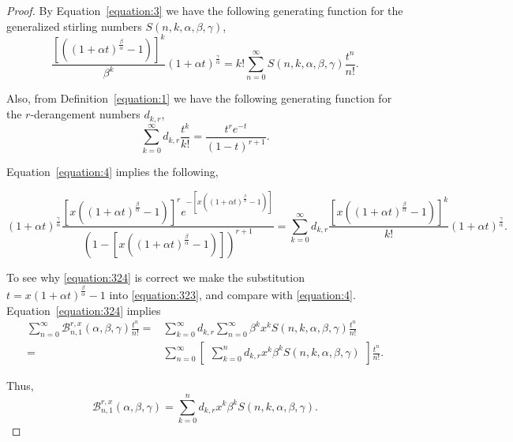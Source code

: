 \documentclass[12pt]{amsart}
\newtheorem{proof 1}{proof 1}
\begin{document}
\begin{proof} By Equation~\eqref{equation:3} we have the following generating function for the generalized stirling numbers $S(n,k,\alpha,\beta,\gamma)$, \begin{equation}\label{equation:322}
		\frac{[((1+\alpha t)^\frac{\beta}{\alpha}-1)]^k}{\beta^k}(1+\alpha t)^{\frac{\gamma}{\alpha}}=k!\sum\limits_{n=0}^{\infty}S(n,k,\alpha,\beta,\gamma)\frac{t^n}{n!}.
	\end{equation}
	
	Also, from Definition~\ref{equation:1} we have the following generating function for the $r$-derangement numbers $d_{k,r}$, 
		\begin{equation}\label{equation:323}
		\sum_{k=0}^{\infty}d_{k,r}\frac{t^k}{k!}=\frac{t^re^{-t}}{(1-t)^{r+1}}.
	\end{equation}
	
	
	
	Equation~\eqref{equation:4} implies the following,
	
	
	\begin{equation}\label{equation:324}(1+\alpha t)^{\frac{\gamma}{\alpha}}\frac{[x((1+\alpha t)^\frac{\beta}{\alpha}-1)]^re^{-[x((1+\alpha t)^\frac{\beta}{\alpha}-1)]}}{(1-[x((1+\alpha t)^\frac{\beta}{\alpha}-1)])^{r+1}}=\sum\limits_{k=0}^{\infty}d_{k,r}\frac{[x((1+\alpha t)^\frac{\beta}{\alpha}-1)]^k}{k!}(1+\alpha t)^{\frac{\gamma}{\alpha}}. \end{equation}
	
	
	To see why \eqref{equation:324} is correct we make the substitution $t=x(1+\alpha t)^\frac{\beta}{\alpha}-1$ into \eqref{equation:323}, and compare with \eqref{equation:4}. Equation~\ref{equation:324} implies 
	\begin{align*}
		\sum\limits_{n=0}^\infty	\mathcal{B}^{r,x}_{n,1}(\alpha,\beta,\gamma)\frac{t^n}{n!}=&\sum\limits_{k=0}^{\infty}d_{k,r}\sum\limits_{n=0}^{\infty}\beta^{k}x^{k}S(n,k,\alpha,\beta,\gamma)\frac{t^n}{n!}\\=&\sum\limits_{n=0}^{\infty}\begin{bmatrix}\sum\limits_{k=0}^nd_{k,r}x^{k}\beta^{k}S(n,k,\alpha,\beta,\gamma)\end{bmatrix}\frac{t^n}{n!}.
	\end{align*}
	
	Thus, 
		\begin{equation}
		\mathcal{B}^{r,x}_{n,1}(\alpha,\beta,\gamma)=\sum_{k=0}^{n}d_{k,r}x^{k}\beta^{k} S(n,k,\alpha,\beta,\gamma).
	\end{equation}
	
\end{proof}
\end{document}

